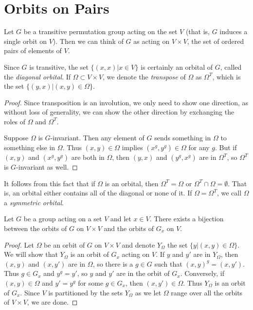 \section*{Orbits on Pairs}

Let $G$ be a transitive permutation group acting on the set $V$ (that is, $G$ induces a single orbit on $V$).  Then we can think of $G$ as acting on $V\times  V$, the set of ordered pairs of elements of $V$.


Since $G$ is transitive, the set $\{(x,x)|x\in V\}$ is certainly an orbital of $G$, called the \textit{diagonal orbital}.  If $\Omega\subset V\times V$, we denote the \textit{transpose} of $\Omega$ as $\Omega^T$, which is the set $\{(y,x)|(x,y)\in\Omega\}$.  

\begin{proof}
	Since transposition is an involution, we only need to show one direction, as without loss of generality, we can show the other direction by exchanging the roles of $\Omega$ and $\Omega^T$.
	
	Suppose $\Omega$ is $G$-invariant.  Then any element of $G$ sends something in $\Omega$ to something else in $\Omega$.  Thus $(x,y)\in \Omega$ implies $(x^g,y^g)\in \Omega$ for any $g$.  But if $(x,y)$ and $(x^g,y^g)$ are both in $\Omega$, then $(y,x)$ and $(y^g,x^g)$ are in $\Omega^T$, so $\Omega^T$ is $G$-invariant as well.
\end{proof}

It follows from this fact that if $\Omega$ is an orbital, then $\Omega^T=\Omega$ or $\Omega^T\cap\Omega=\emptyset$.  That is, an orbital either contains all of the diagonal or none of it.  If $\Omega=\Omega^T$, we call $\Omega$ a \textit{symmetric orbital}.


\begin{lemma}
{Let $G$ be a group acting on a set $V$ and let $x\in V$.  There exists a bijection between the orbits of $G$ on $V\times V$ and the orbits of $G_x$ on $V$.}
\end{lemma}

\begin{proof}
	
	
	Let $\Omega$ be an orbit of $G$ on $V\times V$ and denote $Y_\Omega$ the set $\{y|(x,y)\in\Omega\}$.  We will show that $Y_\Omega$ is an orbit of $G_x$ acting on $V$.  If $y$ and $y'$ are in $Y_\Omega$, then $(x,y)$ and $(x,y')$ are in $\Omega$, so there is a $g\in G$ such that $(x,y)^g = (x,y')$.  Thus $g\in G_x$ and $y^g=y'$, so $y$ and $y'$ are in the orbit of $G_x$.  Conversely, if $(x,y)\in\Omega$ and $y'=y^g$ for some $g\in G_x$, then $(x,y')\in\Omega$.   Thus $Y_\Omega$ is an orbit of $G_x$.  Since $V$ is partitioned by the sets $Y_\Omega$ as we let $\Omega$ range over all the orbits of $V\times V$, we are done.
	
	
	
	
\end{proof}

